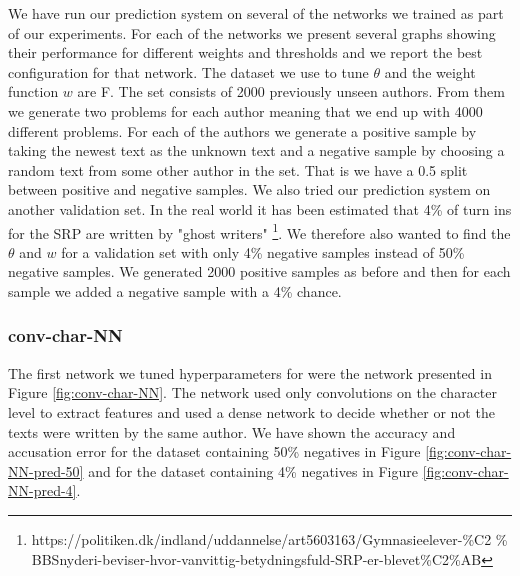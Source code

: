 We have run our prediction system on several of the networks we trained as
part of our experiments. For each of the networks we present several graphs
showing their performance for different weights and thresholds and we report
the best configuration for that network. The dataset we use to tune $\theta$
and the weight function $w$ are F. The set consists of 2000 previously unseen
authors. From them we generate two problems for each author meaning that we
end up with 4000 different problems. For each of the authors we generate a
positive sample by taking the newest text as the unknown text and a negative
sample by choosing a random text from some other author in the set. That is
we have a 0.5 split between positive and negative samples. We also tried our
prediction system on another validation set. In the real world it has been
estimated that 4\% of turn ins for the \gls{SRP} are written by "ghost writers"
\footnote{https://politiken.dk/indland/uddannelse/art5603163/Gymnasieelever-\%C2
\% BBSnyderi-beviser-hvor-vanvittig-betydningsfuld-SRP-er-blevet\%C2\%AB}. We
therefore also wanted to find the $\theta$ and $w$ for a validation set with
only 4\% negative samples instead of 50\% negative samples. We generated 2000
positive samples as before and then for each sample we added a negative sample
with a 4\% chance.


\subsubsection{\glsdesc{conv-char-NN}}

The first network we tuned hyperparameters for were the network presented
in Figure \ref{fig:conv-char-NN}. The network used only convolutions on the
character level to extract features and used a dense network to decide whether
or not the texts were written by the same author. We have shown the accuracy
and accusation error for the dataset containing 50\% negatives in Figure
\ref{fig:conv-char-NN-pred-50} and for the dataset containing 4\% negatives in
Figure \ref{fig:conv-char-NN-pred-4}.

